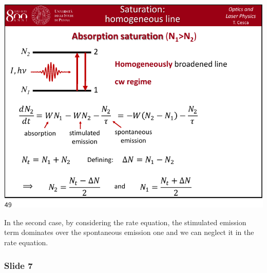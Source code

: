 \documentclass[../main/main.tex]{subfiles}
\begin{document}
\begin{minipage}[]{0.5\linewidth}
\centering
\includegraphics[page=6,width=1\textwidth]{../lessons/pdf_file/10_lecture.pdf}
\end{minipage}
\hspace{0.3cm}\vspace{0.3cm}
\begin{minipage}[c]{0.47\linewidth}

In the second case, by considering the rate equation, the stimulated emission term dominates over the spontaneous emission one and we can neglect it in the rate equation.

\end{minipage}

\newpage

\subsubsection*{Slide 7}
\end{document}

